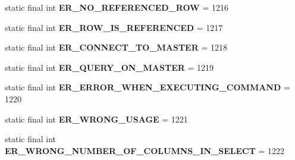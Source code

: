 \begin{DoxyCompactItemize}
\item 
\mbox{\label{classcom_1_1mysql_1_1cj_1_1exceptions_1_1_mysql_error_numbers_a8303655bdcd35ed10883484e09fe6fa4}} 
static final int {\bfseries E\+R\+\_\+\+N\+O\+\_\+\+R\+E\+F\+E\+R\+E\+N\+C\+E\+D\+\_\+\+R\+OW} = 1216
\item 
\mbox{\label{classcom_1_1mysql_1_1cj_1_1exceptions_1_1_mysql_error_numbers_ad4d4971f704a1cec4f3322b330252402}} 
static final int {\bfseries E\+R\+\_\+\+R\+O\+W\+\_\+\+I\+S\+\_\+\+R\+E\+F\+E\+R\+E\+N\+C\+ED} = 1217
\item 
\mbox{\label{classcom_1_1mysql_1_1cj_1_1exceptions_1_1_mysql_error_numbers_af1ae673692272e19ad8dfe6dadfcc3d2}} 
static final int {\bfseries E\+R\+\_\+\+C\+O\+N\+N\+E\+C\+T\+\_\+\+T\+O\+\_\+\+M\+A\+S\+T\+ER} = 1218
\item 
\mbox{\label{classcom_1_1mysql_1_1cj_1_1exceptions_1_1_mysql_error_numbers_a673d2939b1cc242d181dbdb6d051082a}} 
static final int {\bfseries E\+R\+\_\+\+Q\+U\+E\+R\+Y\+\_\+\+O\+N\+\_\+\+M\+A\+S\+T\+ER} = 1219
\item 
\mbox{\label{classcom_1_1mysql_1_1cj_1_1exceptions_1_1_mysql_error_numbers_a839293e750fc95c5b3248c221c86da03}} 
static final int {\bfseries E\+R\+\_\+\+E\+R\+R\+O\+R\+\_\+\+W\+H\+E\+N\+\_\+\+E\+X\+E\+C\+U\+T\+I\+N\+G\+\_\+\+C\+O\+M\+M\+A\+ND} = 1220
\item 
\mbox{\label{classcom_1_1mysql_1_1cj_1_1exceptions_1_1_mysql_error_numbers_a0a27ff9ffc17d54fd09e25c2f57cf337}} 
static final int {\bfseries E\+R\+\_\+\+W\+R\+O\+N\+G\+\_\+\+U\+S\+A\+GE} = 1221
\item 
\mbox{\label{classcom_1_1mysql_1_1cj_1_1exceptions_1_1_mysql_error_numbers_af5288491183c7db441fcee458f51d00e}} 
static final int {\bfseries E\+R\+\_\+\+W\+R\+O\+N\+G\+\_\+\+N\+U\+M\+B\+E\+R\+\_\+\+O\+F\+\_\+\+C\+O\+L\+U\+M\+N\+S\+\_\+\+I\+N\+\_\+\+S\+E\+L\+E\+CT} = 1222

\end{DoxyCompactItemize}
